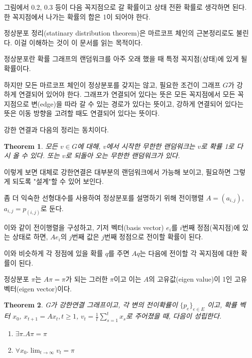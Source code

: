 \documentclass[ %
    a4paper,    %
    amsmath,    %
    itemph,     %
]{oblivoir}     %
\theoremstyle{theorem}
\newtheorem{theorem}{Theorem}
\theoremstyle{theorem}
\theoremstyle{theorem}
\theoremstyle{definition}
\theoremstyle{remark}
\begin{document}
그림에서 0.2, 0.3 등이 다음 꼭지점으로 갈 확률이고 상태 전환 확률로 
생각하면 된다. 한 꼭지점에서 나가는 확률의 합은 1이 되어야 한다. 

정상분포 정리(statinary distribution theorem)은 마르코프 체인의 근본정리로도 
불린다. 이걸 이해하는 것이 이 문서를 읽는 목적이다. 

정상분포란 확률 그래프의 랜덤워크를 아주 오래 했을 때 특정 꼭지점(상태)에 
있게 될 확률이다. 

하지만 모든 마르코프 체인이 정상분포를 갖지는 않고, 필요한 조건이 
그래프 $G$가 강하게 연결되어 있어야 한다. 그래프가 연결되어 있다는 뜻은 
모든 꼭지점에서 모든 꼭지점으로 변(edge)을 따라 갈 수 있는 경로가 있다는 뜻이고, 
강하게 연결되어 있다는 뜻은 이동 방향을 고려할 때도 연결되어 있다는 뜻이다. 

강한 연결과 다음의 정리는 동치이다. 

\begin{theorem}
모든 $v \in G$에 대해, $v$에서 시작한 무한한 랜덤워크는 $v$로 확률 1로 
다시 올 수 있다. 또는 $v$로 되돌아 오는 무한한 랜덤워크가 있다. 
\end{theorem}

이렇게 보면 대체로 강한연결은 대부분의 랜덤워크에서 가능해 보이고, 
필요하면 그렇게 되도록 "설계"할 수 있어 보인다. 

좀 더 익숙한 선형대수를 사용하여 정상분포를 설명하기 위해 
전이행렬 $A = (a_{i, j})$, $a_{i,j} = p_{(i, j)}$로 둔다. 

이와 같이 전이행렬을 구성하고, 기저 벡터(basis vector) $e_i$를 
$i$번째 정점(꼭지점)에 있는 상태로 하면, $Ae_i$의 $j$번째 값은 
$j$번째 정점으로 전이할 확률이 된다. 

이와 비슷하게 각 정점에 있을 확률 $q$를 주면 $Aq$는 다음에 
전이할 각 꼭지점에 대한 확률이 된다. 

정상분포 $\pi$는 $A\pi= \pi$가 되는 그러한 $\pi$이고 
이는 $A$의 고유값(eigen value)이 1인 고유벡터(eigen vector)이다. 

\begin{theorem}
G가 강한연결 그래프이고, 각 변의 전이확률이 $\{p_e\}_{e \in E}$ 이고, 
확률 벡터 $x_0$, $x_{t+1} = Ax_t, t \ge 1$, $v_t = \frac{1}{t}\sum_{s=1}^t x_s$로 
주어졌을 때, 다음이 성립한다. 
\begin{enumerate}
\item $\exists \pi . A\pi = \pi$
\item $\forall x_0 . \lim_{t \to \infty} v_t = \pi$

\end{enumerate}

\end{theorem}
\end{document}
